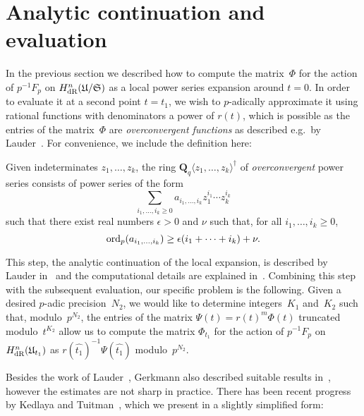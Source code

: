 \section{Analytic continuation and evaluation}
\label{sec:01-dm-06-continuation}

In the previous section we described how to compute the matrix~$\Phi$ 
for the action of $p^{-1} F_p$ on $H_{\text{dR}}^{n}(\mathfrak{U}/\mathfrak{S})$ 
as a local power series expansion around $t = 0$.  In order to evaluate it 
at a second point $t = t_1$, we wish to $p$-adically approximate it 
using rational functions with denominators a power of $r(t)$, which 
is possible as the entries of the matrix~$\Phi$ are \emph{overconvergent 
functions} as described e.g.\ by Lauder~\citep[\S 3.5]{Lauder2006}.  For 
convenience, we include the definition here:

\begin{defn} \label{defn:Overconvergence}
Given indeterminates $z_1, \dotsc, z_k$, 
the ring $\mathbf{Q}_q \langle z_1, \dotsc, z_k \rangle^{\dagger}$ of 
\emph{overconvergent} power series consists of power series of the form 
\begin{equation*}
\sum_{i_1,\dotsc,i_k \geq 0} a_{i_1,\dotsc,i_k} z_1^{i_1} \dotsm z_k^{i_k}
\end{equation*}
such that there exist real numbers $\epsilon > 0$ and $\nu$ 
such that, for all $i_1, \dotsc, i_k \geq 0$, 
\begin{equation*}
\operatorname{ord}_p (a_{i_1,\dotsc,i_k}) \geq \epsilon(i_1 + \dotsb + i_k) + \nu.
\end{equation*}
\end{defn}

This step, the analytic continuation of the local expansion, is described 
by Lauder in~\citep[\S 5.2]{Lauder2006} and the computational details are 
explained in~\citep[\S 8.1]{Lau04a}.  Combining this step with the subsequent 
evaluation, our specific problem is the following.  Given a desired $p$-adic 
precision~$N_2$, we would like to determine integers~$K_1$ and~$K_2$ such 
that, modulo~$p^{N_2}$, the entries of the matrix $\Psi(t) = r(t)^m \Phi(t)$ 
truncated modulo~$t^{K_2}$ allow us to compute the matrix $\Phi_{t_1}$ for 
the action of $p^{-1} F_p$ on $H_{\text{dR}}^{n}(\mathfrak{U}_{t_1})$ as 
$r(\hat{t_1})^{-1} \Psi(\hat{t_1})$ modulo~$p^{N_2}$.

Besides the work of Lauder~\citep[\S 8.1]{Lau04a}, Gerkmann also described 
suitable results in~\citep[\S 6]{Gerkmann2007}, however the estimates are 
not sharp in practice.  There has been recent progress by Kedlaya and 
Tuitman~\citep[Theorem~2.1]{KedlayaTuitman2012}, which we present in a 
slightly simplified form:

